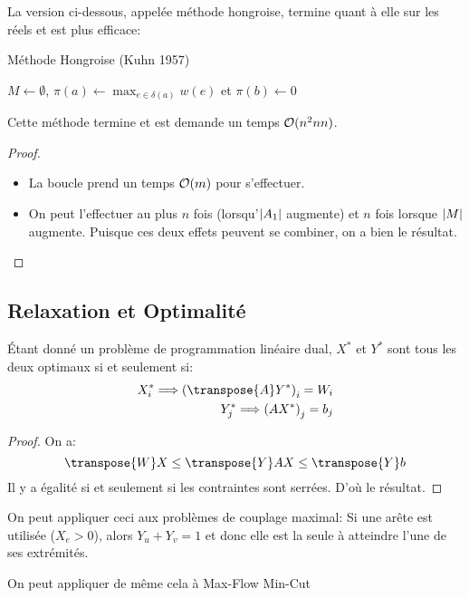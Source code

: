 \documentclass[math, info]{cours}
\begin{document}
La version ci-dessous, appelée méthode hongroise, termine quant à elle sur les réels et est plus efficace:
\begin{algorithm}
	\caption{Méthode Hongroise (Kuhn 1957)}
	\begin{algorithmic}
		\State $M \gets \emptyset$, $\displaystyle\pi(a) \gets \max_{e \in \delta(a)} w(e)$ et $\pi(b) \gets 0$
			\EndIf
		 \EndWhile
	\end{algorithmic}
\end{algorithm}

\begin{thm}
	Cette méthode termine et est demande un temps $\mathcal{O}(n^{2}nn)$.
\end{thm}
\begin{proof}
	\begin{itemize}
		\item La boucle prend un temps $\mathcal{O}(m)$ pour s'effectuer.
		\item On peut l'effectuer au plus $n$ fois (lorsqu'$\left|A_{1}\right|$ augmente) et $n$ fois lorsque $\left|M\right|$ augmente.
			Puisque ces deux effets peuvent se combiner, on a bien le résultat.
	\end{itemize}
\end{proof}

\subsection{Relaxation et Optimalité}
\begin{proposition}[Relaxation]
	Étant donné un problème de programmation linéaire dual, $X^{*}$ et $Y^{*}$ sont tous les deux optimaux si et seulement si:
	\begin{align*}
		X_{i}^{*} \Longrightarrow \left(\transpose{A}Y^{*}\right)_{i} = W_{i}\\
		Y_{j}^{*} \Longrightarrow \left(AX^{*}\right)_{j} = b_{j}
	\end{align*}
	\label{prop:relaxation}
\end{proposition}
\begin{proof}
	On a:
	\begin{equation*}
		\transpose{W}X \leq \transpose{Y}AX \leq \transpose{Y}b
	\end{equation*}
	Il y a égalité si et seulement si les contraintes sont serrées.
	D'où le résultat.
\end{proof}

On peut appliquer ceci aux problèmes de couplage maximal:
Si une arête est utilisée ($X_{e} > 0$), alors $Y_{u} + Y_{v} = 1$ et donc elle est la seule à atteindre l'une de ses extrémités.

On peut appliquer de même cela à Max-Flow Min-Cut
\end{document}
